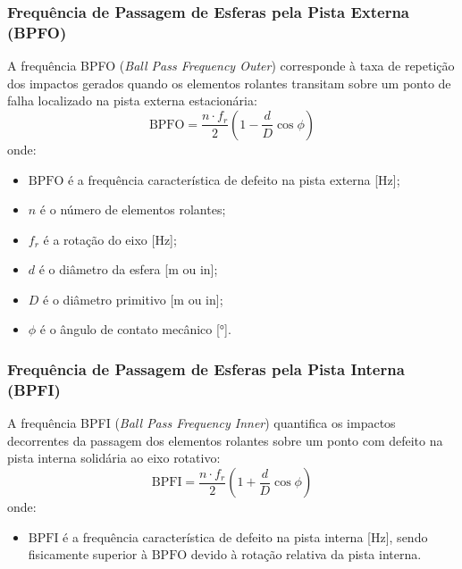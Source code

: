 \subsubsection{Frequência de Passagem de Esferas pela Pista Externa (BPFO)}
A frequência BPFO (\textit{Ball Pass Frequency Outer}) corresponde à taxa de repetição dos impactos gerados quando os elementos rolantes transitam sobre um ponto de falha localizado na pista externa estacionária:
\begin{equation}
    \text{BPFO} = \frac{n \cdot f_r}{2} \left( 1 - \frac{d}{D} \cos\phi \right)
    \label{eq:bpfo}
\end{equation}
onde:
\begin{itemize}
    \item $\text{BPFO}$ é a frequência característica de defeito na pista externa [\si{\hertz}];
    \item $n$ é o número de elementos rolantes;
    \item $f_r$ é a rotação do eixo [\si{\hertz}];
    \item $d$ é o diâmetro da esfera [\si{\meter} ou \si{in}];
    \item $D$ é o diâmetro primitivo [\si{\meter} ou \si{in}];
    \item $\phi$ é o ângulo de contato mecânico [\si{\degree}].
\end{itemize}

\subsubsection{Frequência de Passagem de Esferas pela Pista Interna (BPFI)}
A frequência BPFI (\textit{Ball Pass Frequency Inner}) quantifica os impactos decorrentes da passagem dos elementos rolantes sobre um ponto com defeito na pista interna solidária ao eixo rotativo:
\begin{equation}
    \text{BPFI} = \frac{n \cdot f_r}{2} \left( 1 + \frac{d}{D} \cos\phi \right)
    \label{eq:bpfi}
\end{equation}
onde:
\begin{itemize}
    \item $\text{BPFI}$ é a frequência característica de defeito na pista interna [\si{\hertz}], sendo fisicamente superior à $\text{BPFO}$ devido à rotação relativa da pista interna.
\end{itemize}

